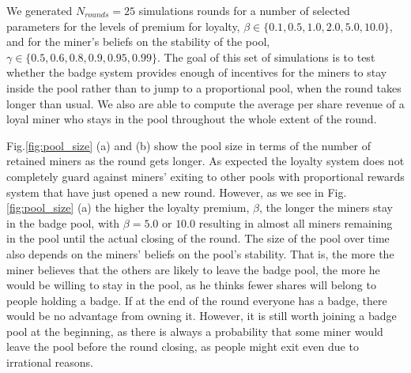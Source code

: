 \documentclass{article}
\theoremstyle{plain}
\theoremstyle{definition}
\begin{document}
We generated $N_{rounds} = 25$ simulations rounds for a number of selected parameters
for the levels of premium for loyalty, $\beta \in \{0.1, 0.5, 1.0,  2.0, 5.0, 10.0\}$, 
and for the miner's beliefs on the stability of the pool, 
$\gamma \in \{0.5, 0.6, 0.8, 0.9, 0.95, 0.99\}$. The goal of this set of simulations
is to test whether the badge system provides enough of incentives for the miners to stay
inside the pool rather than to jump to a proportional pool, when the round takes longer
than usual. We also are able to compute the average per share revenue of a loyal miner 
who stays in the pool throughout the whole extent of the round.

Fig.\ref{fig:pool_size} (a) and (b) show the pool size in terms of the number of
retained miners as the round gets longer. As expected the loyalty system
does not completely guard against miners' exiting to other pools with proportional
rewards system that have just opened a new round. However, as we see in 
Fig.\ref{fig:pool_size} (a) the higher the loyalty premium, $\beta$, the longer the miners stay in the badge pool, with $\beta = 5.0$ or $10.0$ resulting in almost
all miners remaining in the pool until the actual closing of the round.
The size of the pool over time also depends on the miners' beliefs on the pool's
stability. That is, the more the miner believes that the others are likely to leave 
the badge pool, the more he would be willing to stay in the pool, as he thinks
fewer shares will belong to people holding a badge. If at the end of the round
everyone has a badge, there would be no advantage from owning it. However, it
is still worth joining a badge pool at the beginning, as there is always
a probability that some miner would leave the pool before the round closing,
as people might exit even due to irrational reasons.
\end{document}
